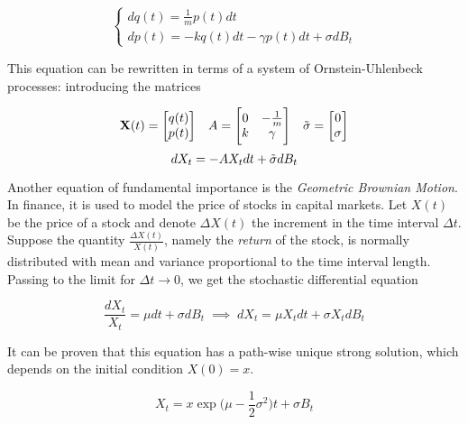 \begin{equation}
    \begin{cases}
        dq(t) = \frac{1}{m} p(t) dt \\
        dp(t) = -kq(t)dt-\gamma p(t) dt + \sigma dB_t 
    \end{cases}
\end{equation}

This equation can be rewritten in terms of a system of Ornstein-Uhlenbeck processes: introducing the matrices

\begin{equation*}
    \textbf{X}(t) = \begin{bmatrix}
        q(t) \\
        p(t)
    \end{bmatrix}
    \;\;\;
    A = 
    \begin{bmatrix}
        0 & -\frac{1}{m} \\
        k & \gamma 
    \end{bmatrix}
    \;\;\;
    \Tilde{\sigma} = \begin{bmatrix}
        0 \\
        \sigma
    \end{bmatrix}
\end{equation*}
\begin{equation*}
    dX_t = -A X_t dt + \Tilde{\sigma} dB_t
\end{equation*}

Another equation of fundamental importance is the \textit{Geometric Brownian Motion}. In finance, it is used to model the price of stocks in capital markets. Let $X(t)$ be the price of a stock and denote $\Delta X(t)$ the increment in the time interval $\Delta t$. Suppose the quantity $\frac{\Delta X(t)}{X(t)}$, namely the \textit{return} of the stock, is normally distributed with mean and variance proportional to the time interval length. Passing to the limit for $\Delta t \to 0$, we get the stochastic differential equation

\begin{equation*}
    \frac{dX_t}{X_t} = \mu dt + \sigma dB_t \; \implies \; dX_t = \mu X_t dt + \sigma X_t dB_t
\end{equation*}

It can be proven that this equation has a path-wise unique strong solution, which depends on the initial condition $X(0) = x$. 

\begin{equation*}
    X_t = x \exp{ \Big(\mu-\frac{1}{2} \sigma^2\Big)t + \sigma B_t}
\end{equation*}

